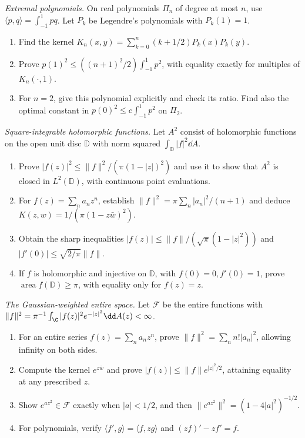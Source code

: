 \begin{exercise}[$\star$]\label{pb:christoffel}
\emph{Extremal polynomials.} On real polynomials $\Pi_n$ of degree at most $n$, use $\langle p,q\rangle=\int_{-1}^1pq$. Let $P_k$ be Legendre's polynomials with $P_k(1)=1$.
\begin{enumerate}[label=(\alph*)]
\item Find the kernel $K_n(x,y)=\sum_{k=0}^n(k+1/2)P_k(x)P_k(y)$.
\item Prove $p(1)^2\le((n+1)^2/2)\int_{-1}^1p^2$, with equality exactly for multiples of $K_n(\cdot,1)$.
\item For $n=2$, give this polynomial explicitly and check its ratio. Find also the optimal constant in $p(0)^2\le c\int_{-1}^1p^2$ on $\Pi_2$.
\end{enumerate}
\end{exercise}
\begin{exercise}[$\star\star$]\label{pb:bergman}
\emph{Square-integrable holomorphic functions.} Let $A^2$ consist of holomorphic functions on the open unit disc $\mathbb D$ with norm squared $\int_{\mathbb D}|f|^2\dd A$.
\begin{enumerate}[label=(\alph*)]
\item Prove $|f(z)|^2\le\|f\|^2/(\pi(1-|z|)^2)$ and use it to show that $A^2$ is closed in $L^2(\mathbb D)$, with continuous point evaluations.
\item For $f(z)=\sum_na_nz^n$, establish $\|f\|^2=\pi\sum_n|a_n|^2/(n+1)$ and deduce $K(z,w)=1/(\pi(1-z\bar w)^2)$.
\item Obtain the sharp inequalities $|f(z)|\le\|f\|/(\sqrt\pi(1-|z|^2))$ and $|f'(0)|\le\sqrt{2/\pi}\|f\|$.
\item If $f$ is holomorphic and injective on $\mathbb D$, with $f(0)=0,f'(0)=1$, prove $\operatorname{area}f(\mathbb D)\ge\pi$, with equality only for $f(z)=z$.
\end{enumerate}
\end{exercise}
\begin{exercise}[$\star\star$]\label{pb:fock}
\emph{The Gaussian-weighted entire space.} Let $\mathcal F$ be the entire functions with $\|f\|^2=\pi^{-1}\int_\C|f(z)|^2e^{-|z|^2}\dd A(z)<\infty$.
\begin{enumerate}[label=(\alph*)]
\item For an entire series $f(z)=\sum_na_nz^n$, prove $\|f\|^2=\sum_nn!|a_n|^2$, allowing infinity on both sides.
\item Compute the kernel $e^{z\bar w}$ and prove $|f(z)|\le\|f\|e^{|z|^2/2}$, attaining equality at any prescribed $z$.
\item Show $e^{az^2}\in\mathcal F$ exactly when $|a|<1/2$, and then $\|e^{az^2}\|^2=(1-4|a|^2)^{-1/2}$.
\item For polynomials, verify $\langle f',g\rangle=\langle f,zg\rangle$ and $(zf)'-zf'=f$.
\end{enumerate}
\end{exercise}
